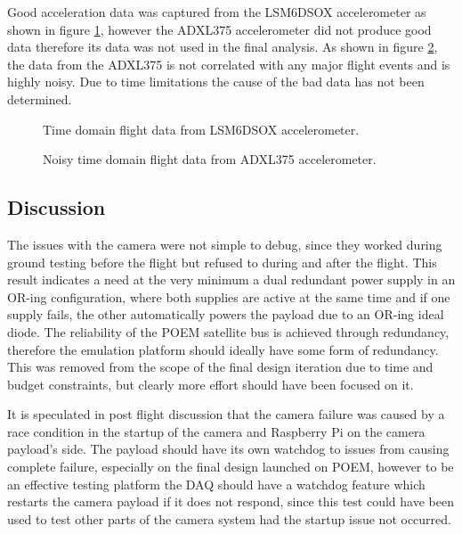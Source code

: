 \documentclass[]{report}
\begin{document}
Good acceleration data was captured from the LSM6DSOX accelerometer as shown in figure \ref{fig:flight-16g-time-domain}, however the ADXL375 accelerometer did not produce good data therefore its data was not used in the final analysis. As shown in figure \ref{fig:flight-200g-time-domain}, the data from the ADXL375 is not correlated with any major flight events and is highly noisy. Due to time limitations the cause of the bad data has not been determined.

\begin{figure}[H]
  \centering
  
  \caption{Time domain flight data from LSM6DSOX accelerometer.}
  \label{fig:flight-16g-time-domain}
\end{figure}

\begin{figure}[H]
  \centering
  
  \caption{Noisy time domain flight data from ADXL375 accelerometer.}
  \label{fig:flight-200g-time-domain}
\end{figure}

\subsection{Discussion}

The issues with the camera were not simple to debug, since they worked during ground testing before the flight but refused to during and after the flight. This result indicates a need at the very minimum a dual redundant power supply in an OR-ing configuration, where both supplies are active at the same time and if one supply fails, the other automatically powers the payload due to an OR-ing ideal diode. The reliability of the POEM satellite bus is achieved through redundancy, therefore the emulation platform should ideally have some form of redundancy. This was removed from the scope of the final design iteration due to time and budget constraints, but clearly more effort should have been focused on it.

It is speculated in post flight discussion that the camera failure was caused by a race condition in the startup of the camera and Raspberry Pi on the camera payload's side. The payload should have its own watchdog to issues from causing complete failure, especially on the final design launched on POEM, however to be an effective testing platform the DAQ should have a watchdog feature which restarts the camera payload if it does not respond, since this test could have been used to test other parts of the camera system had the startup issue not occurred.
\end{document}
